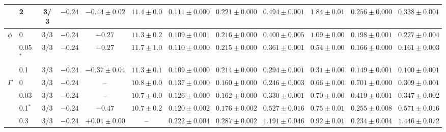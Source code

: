 \begin{tabular}{ll cccccccccc}
 & 2 & 3/3 & $-0.24$ & $-0.44 \pm 0.02$ & $11.4 \pm 0.0$ & $0.111 \pm 0.000$ & $0.221 \pm 0.000$ & $0.494 \pm 0.001$ & $1.84 \pm 0.01$ & $0.256 \pm 0.000$ & $0.338 \pm 0.001$ \\
\midrule
$\phi$ & 0 & 3/3 & $-0.24$ & $-0.27$ & $11.3 \pm 0.2$ & $0.109 \pm 0.001$ & $0.216 \pm 0.000$ & $0.400 \pm 0.005$ & $1.09 \pm 0.00$ & $0.198 \pm 0.001$ & $0.227 \pm 0.004$ \\
 & 0.05$^{\ast}$ & 3/3 & $-0.24$ & $-0.27$ & $11.7 \pm 1.0$ & $0.110 \pm 0.000$ & $0.215 \pm 0.000$ & $0.361 \pm 0.001$ & $0.54 \pm 0.00$ & $0.166 \pm 0.000$ & $0.161 \pm 0.003$ \\
 & 0.1 & 3/3 & $-0.24$ & $-0.37 \pm 0.04$ & $11.3 \pm 0.1$ & $0.109 \pm 0.000$ & $0.214 \pm 0.000$ & $0.294 \pm 0.001$ & $0.31 \pm 0.00$ & $0.149 \pm 0.001$ & $0.100 \pm 0.001$ \\
\midrule
$\Gamma$ & 0 & 3/3 & $-0.24$ & -- & $10.8 \pm 0.0$ & $0.137 \pm 0.000$ & $0.160 \pm 0.000$ & $0.246 \pm 0.003$ & $0.66 \pm 0.00$ & $0.701 \pm 0.000$ & $0.309 \pm 0.001$ \\
 & 0.03 & 3/3 & $-0.24$ & -- & $10.7 \pm 0.0$ & $0.126 \pm 0.000$ & $0.162 \pm 0.000$ & $0.330 \pm 0.001$ & $0.70 \pm 0.00$ & $0.419 \pm 0.001$ & $0.347 \pm 0.002$ \\
 & 0.1$^{\ast}$ & 3/3 & $-0.24$ & $-0.47$ & $10.7 \pm 0.2$ & $0.120 \pm 0.002$ & $0.176 \pm 0.002$ & $0.527 \pm 0.016$ & $0.75 \pm 0.01$ & $0.255 \pm 0.008$ & $0.571 \pm 0.016$ \\
 & 0.3 & 3/3 & $-0.24$ & $+0.01 \pm 0.00$ & -- & $0.222 \pm 0.004$ & $0.287 \pm 0.002$ & $1.191 \pm 0.046$ & $0.92 \pm 0.01$ & $0.234 \pm 0.004$ & $1.446 \pm 0.072$ \\
\bottomrule
\end{tabular}
